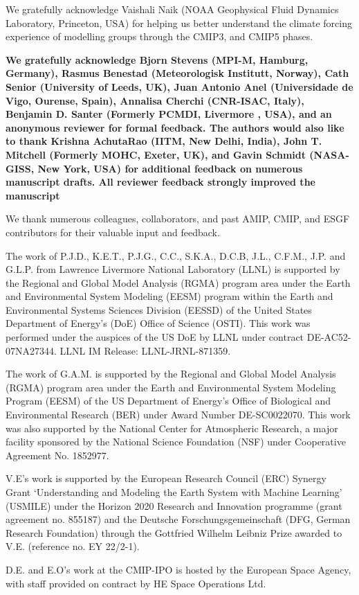 \documentclass[manuscript]{copernicus}
\def\cred#1{{\color{red}#1}}
\begin{document}
\begin{acknowledgements}
We gratefully acknowledge Vaishali Naik (NOAA Geophysical Fluid Dynamics Laboratory, Princeton, USA) for helping us better understand the climate forcing experience of modelling groups through the CMIP3, and CMIP5 phases.

\cred{\textbf{We gratefully acknowledge Bjorn Stevens (MPI-M, Hamburg, Germany), Rasmus Benestad (Meteorologisk Institutt, Norway), Cath Senior (University of Leeds, UK), Juan Antonio Anel (Universidade de Vigo, Ourense, Spain), Annalisa Cherchi (CNR-ISAC, Italy), Benjamin D. Santer (Formerly PCMDI, Livermore , USA), and an anonymous reviewer for formal feedback. The authors would also like to thank Krishna AchutaRao (IITM, New Delhi, India), John T. Mitchell (Formerly MOHC, Exeter, UK), and Gavin Schmidt (NASA-GISS, New York, USA) for additional feedback on numerous manuscript drafts. All reviewer feedback strongly improved the manuscript}}

We thank numerous colleagues, collaborators, and past AMIP, CMIP, and ESGF contributors for their valuable input and feedback.

The work of P.J.D., K.E.T., P.J.G., C.C., S.K.A., D.C.B, J.L., C.F.M., J.P. and G.L.P. from Lawrence Livermore National Laboratory (LLNL) is supported by the Regional and Global Model Analysis (RGMA) program area under the Earth and Environmental System Modeling (EESM) program within the Earth and Environmental Systems Sciences Division (EESSD) of the United States Department of Energy’s (DoE) Office of Science (OSTI). This work was performed under the auspices of the US DoE by LLNL under contract DE-AC52-07NA27344. LLNL IM Release: LLNL-JRNL-871359.

The work of G.A.M. is supported by the Regional and Global Model Analysis (RGMA) program area under the Earth and Environmental System Modeling Program (EESM) of the US Department of Energy's Office of Biological and Environmental Research (BER) under Award Number DE-SC0022070. This work was also supported by the National Center for Atmospheric Research, a major facility sponsored by the National Science Foundation (NSF) under Cooperative Agreement No. 1852977.

V.E’s work is supported by the European Research Council (ERC) Synergy Grant ‘Understanding and Modeling the Earth System with Machine Learning’ (USMILE) under the Horizon 2020 Research and Innovation programme (grant agreement no. 855187) and the Deutsche Forschungsgemeinschaft (DFG, German Research Foundation) through the Gottfried Wilhelm Leibniz Prize awarded to V.E. (reference no. EY 22/2-1).

D.E. and E.O's work at the CMIP-IPO is hosted by the European Space Agency, with staff provided on contract by HE Space Operations Ltd.


\end{acknowledgements}
\end{document}
